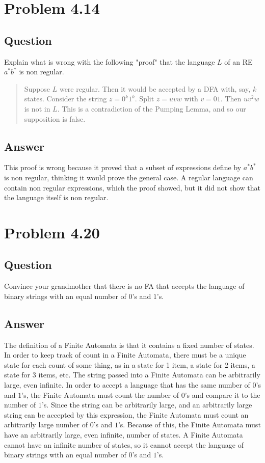 \documentclass[12pt, a4paper]{article}
\begin{document}
\section{Problem 4.14}
\subsection{Question}
Explain what is wrong with the following "proof" that the language $L$ of an RE $a^{*}b^{*}$ is non regular.

\begin{quotation}
Suppose $L$ were regular. Then it would be accepted by a DFA with, say, $k$ states. Consider the string $z=0^{k}1^{k}$. Split $z=uvw$ with $v=01$. Then $uv^{2}w$ is not in $L$. This is a contradiction of the Pumping Lemma, and so our supposition is false.
\end{quotation}
\subsection{Answer}
This proof is wrong because it proved that a subset of expressions define by $a^{*}b^{*}$ is non regular, thinking it would prove the general case. A regular language can contain non regular expressions, which the proof showed, but it did not show that the language itself is non regular.

\section{Problem 4.20}
\subsection{Question}
Convince your grandmother that there is no FA that accepts the language of binary strings with an equal number of $0$'s and $1$'s.
\subsection{Answer}
The definition of a Finite Automata is that it contains a fixed number of states.
In order to keep track of count in a Finite Automata, there must be a unique state for each count of some thing, as in a state for 1 item, a state for 2 items, a state for 3 items, etc.
The string passed into a Finite Automata can be arbitrarily large, even infinite.
In order to accept a language that has the same number of $0$'s and $1$'s, the Finite Automata must count the number of $0$'s and compare it to the number of $1$'s.
Since the string can be arbitrarily large, and an arbitrarily large string can be accepted by this expression, the Finite Automata must count an arbitrarily large number of $0$'s and $1$'s.
Because of this, the Finite Automata must have an arbitrarily large, even infinite, number of states.
A Finite Automata cannot have an infinite number of states, so it cannot accept the language of binary strings with an equal number of $0$'s and $1$'s.
\end{document}

